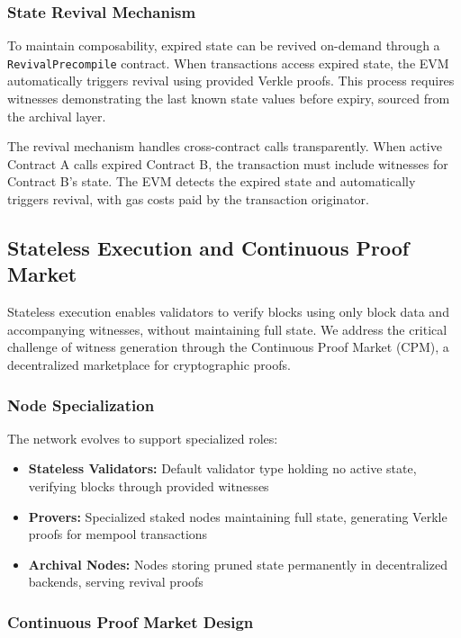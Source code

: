 \documentclass{article}
\begin{document}
\subsubsection{State Revival Mechanism}

To maintain composability, expired state can be revived on-demand through a \texttt{RevivalPrecompile} contract. When transactions access expired state, the EVM automatically triggers revival using provided Verkle proofs. This process requires witnesses demonstrating the last known state values before expiry, sourced from the archival layer.

The revival mechanism handles cross-contract calls transparently. When active Contract A calls expired Contract B, the transaction must include witnesses for Contract B's state. The EVM detects the expired state and automatically triggers revival, with gas costs paid by the transaction originator.

\subsection{Stateless Execution and Continuous Proof Market}

Stateless execution enables validators to verify blocks using only block data and accompanying witnesses, without maintaining full state. We address the critical challenge of witness generation through the Continuous Proof Market (CPM), a decentralized marketplace for cryptographic proofs.

\subsubsection{Node Specialization}

The network evolves to support specialized roles:

\begin{itemize}
\item \textbf{Stateless Validators:} Default validator type holding no active state, verifying blocks through provided witnesses
\item \textbf{Provers:} Specialized staked nodes maintaining full state, generating Verkle proofs for mempool transactions
\item \textbf{Archival Nodes:} Nodes storing pruned state permanently in decentralized backends, serving revival proofs
\end{itemize}

\subsubsection{Continuous Proof Market Design}
\end{document}
